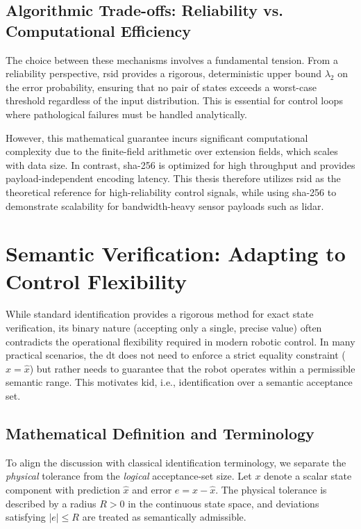 \subsection{Algorithmic Trade-offs: Reliability vs. Computational Efficiency}
\label{subsec:algorithmic_tradeoffs}

The choice between these mechanisms involves a fundamental tension. From a reliability perspective, \gls{rsid} provides a rigorous, deterministic upper bound $\lambda_2$ on the error probability, ensuring that no pair of states exceeds a worst-case threshold regardless of the input distribution. This is essential for control loops where pathological failures must be handled analytically.

However, this mathematical guarantee incurs significant computational complexity due to the finite-field arithmetic over extension fields, which scales with data size. In contrast, \gls{sha}-256 is optimized for high throughput and provides payload-independent encoding latency. This thesis therefore utilizes \gls{rsid} as the theoretical reference for high-reliability control signals, while using \gls{sha}-256 to demonstrate scalability for bandwidth-heavy sensor payloads such as \gls{lidar}.
\section{Semantic Verification: Adapting to Control Flexibility}
\label{sec:kid_application}

While standard identification provides a rigorous method for exact state verification, its binary nature (accepting only a single, precise value) often contradicts the operational flexibility required in modern robotic control. In many practical scenarios, the \gls{dt} does not need to enforce a strict equality constraint ($x = \hat{x}$) but rather needs to guarantee that the robot operates within a permissible semantic range. This motivates \gls{kid}, i.e., identification over a semantic acceptance set.

\subsection{Mathematical Definition and Terminology}
\label{subsec:kid_saturation}
To align the discussion with classical identification terminology, we separate the \emph{physical} tolerance from the \emph{logical} acceptance-set size. Let $x$ denote a scalar state component with prediction $\hat{x}$ and error $e=x-\hat{x}$. The physical tolerance is described by a radius $R>0$ in the continuous state space, and deviations satisfying $|e|\le R$ are treated as semantically admissible.

